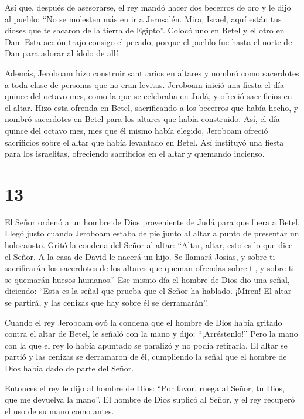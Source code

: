  Así que, después de asesorarse, el rey mandó hacer dos
becerros de oro y le dijo al pueblo: ``No se molesten más en ir a
Jerusalén. Mira, Israel, aquí están tus dioses que te sacaron de la
tierra de Egipto''.  Colocó uno en Betel y el otro en Dan.
 Esta acción trajo consigo el pecado, porque el pueblo fue
hasta el norte de Dan para adorar al ídolo de allí.

 Además, Jeroboam hizo construir santuarios en altares y
nombró como sacerdotes a toda clase de personas que no eran levitas.
 Jeroboam inició una fiesta el día quince del octavo mes,
como la que se celebraba en Judá, y ofreció sacrificios en el altar.
Hizo esta ofrenda en Betel, sacrificando a los becerros que había hecho,
y nombró sacerdotes en Betel para los altares que había construido.
 Así, el día quince del octavo mes, mes que él mismo había
elegido, Jeroboam ofreció sacrificios sobre el altar que había levantado
en Betel. Así instituyó una fiesta para los israelitas, ofreciendo
sacrificios en el altar y quemando incienso.

\hypertarget{section-12}{%
\section{13}\label{section-12}}

 El Señor ordenó a un hombre de Dios proveniente de Judá
para que fuera a Betel. Llegó justo cuando Jeroboam estaba de pie junto
al altar a punto de presentar un holocausto.  Gritó la
condena del Señor al altar: ``Altar, altar, esto es lo que dice el
Señor. A la casa de David le nacerá un hijo. Se llamará Josías, y sobre
ti sacrificarán los sacerdotes de los altares que queman ofrendas sobre
ti, y sobre ti se quemarán huesos humanos.''  Ese mismo día
el hombre de Dios dio una señal, diciendo: ``Esta es la señal que prueba
que el Señor ha hablado. ¡Miren! El altar se partirá, y las cenizas que
hay sobre él se derramarán''.

 Cuando el rey Jeroboam oyó la condena que el hombre de Dios
había gritado contra el altar de Betel, le señaló con la mano y dijo:
``¡Arréstenlo!'' Pero la mano con la que el rey lo había apuntado se
paralizó y no podía retirarla.  El altar se partió y las
cenizas se derramaron de él, cumpliendo la señal que el hombre de Dios
había dado de parte del Señor.

 Entonces el rey le dijo al hombre de Dios: ``Por favor,
ruega al Señor, tu Dios, que me devuelva la mano''. El hombre de Dios
suplicó al Señor, y el rey recuperó el uso de su mano como antes.

